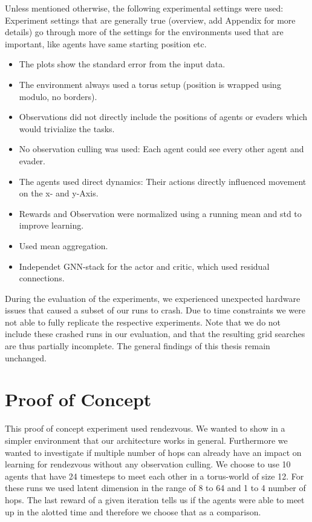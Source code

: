 Unless mentioned otherwise, the following experimental settings were used:
Experiment settings that are generally true (overview, add Appendix for more details)
go through more of the settings for the environments used that are important, like agents have same starting position etc.
\begin{itemize}[noitemsep,nolistsep]
    \item The plots show the standard error from the input data.
    \item The environment always used a torus setup (position is wrapped using modulo, no borders).
    \item Observations did not directly include the positions of agents or evaders which would trivialize the tasks.
    \item No observation culling was used: Each agent could see every other agent and evader.
    \item The agents used direct dynamics: Their actions directly influenced movement on the x- and y-Axis.
    \item Rewards and Observation were normalized using a running mean and std to improve learning.
    \item Used mean aggregation.
    \item Independet GNN-stack for the actor and critic, which used residual connections.
\end{itemize} \par

During the evaluation of the experiments, we experienced unexpected hardware issues that caused a subset of our runs to crash. Due to time constraints we were not able to fully replicate the respective experiments. Note that we do not include these crashed runs in our evaluation, and that the resulting grid searches are thus partially incomplete. The general findings of this thesis remain unchanged. \par



\section{Proof of Concept}
\label{sec:Proof of Concept}
This proof of concept experiment used rendezvous. We wanted to show in a simpler environment that our architecture works in general. Furthermore we wanted to investigate if multiple number of hops can already have an impact on learning for rendezvous without any observation culling. We choose to use 10 agents that have 24 timesteps to meet each other in a torus-world of size 12. For these runs we used latent dimension in the range of 8 to 64 and 1 to 4 number of hops. The last reward of a given iteration tells us if the agents were able to meet up in the alotted time and therefore we choose that as a comparison.

